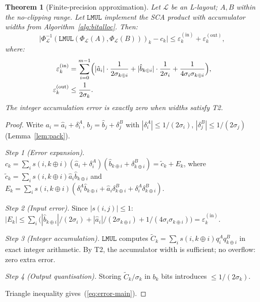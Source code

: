 \documentclass[11pt,a4paper]{article}
\theoremstyle{definition}
\theoremstyle{plain}
\newtheorem{theorem}{Theorem}[section]
\theoremstyle{remark}
\newcommand{\Pack}{\Phi_{\mathcal{L}}}
\newcommand{\Unpack}{\Phi^{-1}_{\mathcal{L}}}
\begin{document}
\begin{theorem}[Finite-precision approximation]
\label{thm:finite-approx}
Let $\mathcal{L}$ be an L-layout; $A,B$ within the no-clipping range.
Let $\mathtt{LMUL}$ implement the SCA product with accumulator widths
from Algorithm~\ref{alg:bitalloc}.
Then:
\begin{equation}\label{eq:error-main}
  \bigl|\Unpack(\mathtt{LMUL}(\Pack(A),\Pack(B)))_k - c_k\bigr|
  \le \varepsilon_k^{(\mathrm{in})} + \varepsilon_k^{(\mathrm{out})},
\end{equation}
where:
\begin{align}
  \varepsilon_k^{(\mathrm{in})}
  &= \sum_{i=0}^{m-1}\Bigl(
    |\hat{a}_i|\cdot\frac{1}{2\sigma_{k\oplus i}}
    +|\hat{b}_{k\oplus i}|\cdot\frac{1}{2\sigma_i}
    +\frac{1}{4\sigma_i\sigma_{k\oplus i}}\Bigr),
    \label{eq:eps-in}\\
  \varepsilon_k^{(\mathrm{out})} &\le \frac{1}{2\sigma_k}.
    \label{eq:eps-out}
\end{align}
The integer accumulation error is exactly zero when widths satisfy T2.
\end{theorem}

\begin{proof}
Write $a_i=\hat{a}_i+\delta_i^A$, $b_j=\hat{b}_j+\delta_j^B$ with
$|\delta_i^A|\le1/(2\sigma_i)$, $|\delta_j^B|\le1/(2\sigma_j)$ (Lemma~\ref{lem:pack}).

\textit{Step 1 (Error expansion).}
$c_k = \sum_i s(i,k\oplus i)(\hat{a}_i+\delta_i^A)(\hat{b}_{k\oplus i}+\delta_{k\oplus i}^B)
     = \tilde{c}_k + E_k$,
where $\tilde{c}_k=\sum_i s(i,k\oplus i)\hat{a}_i\hat{b}_{k\oplus i}$
and $E_k=\sum_i s(i,k\oplus i)(\delta_i^A\hat{b}_{k\oplus i}+\hat{a}_i\delta_{k\oplus i}^B
+\delta_i^A\delta_{k\oplus i}^B)$.

\textit{Step 2 (Input error).}
Since $|s(i,j)|\le1$:
$|E_k|\le\sum_i\bigl(|\hat{b}_{k\oplus i}|/(2\sigma_i)
+|\hat{a}_i|/(2\sigma_{k\oplus i})+1/(4\sigma_i\sigma_{k\oplus i})\bigr)
=\varepsilon_k^{(\mathrm{in})}$.

\textit{Step 3 (Integer accumulation).}
$\mathtt{LMUL}$ computes $\tilde{C}_k=\sum_i s(i,k\oplus i)q_i^A q_{k\oplus i}^B$
in exact integer arithmetic.
By T2, the accumulator width is sufficient; no overflow: zero extra error.

\textit{Step 4 (Output quantisation).}
Storing $\tilde{C}_k/\sigma_k$ in $b_k$ bits introduces $\le1/(2\sigma_k)$.

Triangle inequality gives~(\ref{eq:error-main}).
\end{proof}
\end{document}
